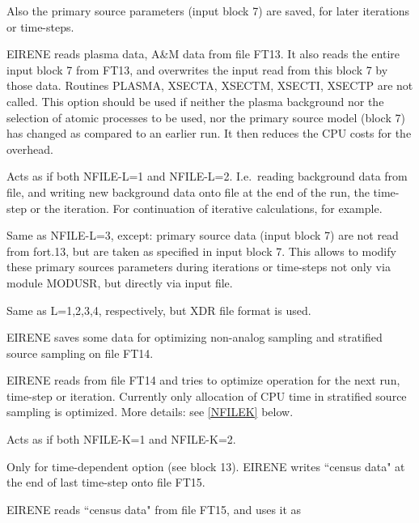 \begin{description}
\begin{description}
                Also the primary source parameters (input block 7) are saved, for later
                iterations or time-steps.
          \item [L = 2 ] EIRENE reads plasma data, A\&M data from file FT13.
                It also reads the entire input block 7 from FT13, and overwrites the input read
                from this block 7 by those data.
                Routines PLASMA, XSECTA, XSECTM, XSECTI, XSECTP  are not called.
                This option should be used if neither the plasma background nor the selection
                of atomic processes to be used, nor the primary source model (block 7) has
                changed as compared to an earlier run.
                It then reduces the CPU costs for the overhead.
          \item [L = 3 ] Acts as if both NFILE-L=1 and NFILE-L=2.
                I.e.\ reading background data from file, and writing new background data onto
                file at the end of the run, the time-step or the iteration.
                For continuation of iterative calculations, for example.
          \item [L = 4 ] Same as NFILE-L=3, except: primary source data (input block 7)
                are not read from fort.13, but are taken as specified in input block 7.
                This allows to modify these primary sources parameters during iterations or
                time-steps not only via module MODUSR, but directly via input file.
          \item [L = 6,7,8,9 ] Same as L=1,2,3,4, respectively, but XDR file format is
                used.
          \item [K = 1 ] EIRENE saves some data for optimizing non-analog sampling and
                stratified source sampling on file FT14.
          \item [K = 2 ] EIRENE reads from file FT14 and tries to optimize operation for
                the next run, time-step or iteration.
                Currently only allocation of CPU time in stratified source sampling is
                optimized.
                More details: see \cref{NFILEK} below.
          \item [K = 3 ] Acts as if both NFILE-K=1 and NFILE-K=2.
          \item [J = 1 ] Only for time-dependent option (see block 13).
                EIRENE writes ``census data" at the end of last time-step onto file FT15.
          \item [J = 2 ] EIRENE reads ``census data" from file FT15, and uses it as

\end{description}
\end{description}
